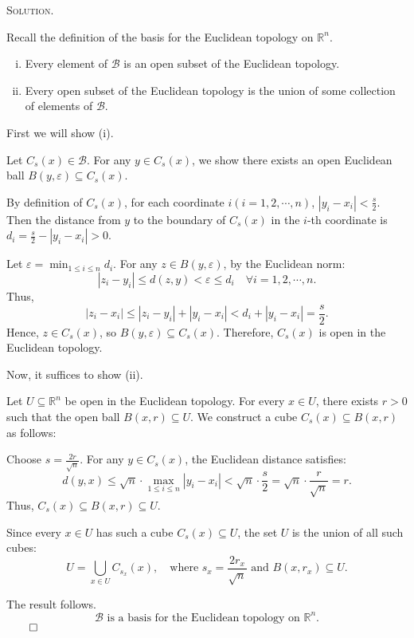 \documentclass[12pt, a4paper, oneside]{ctexart}
\newenvironment{solution}{%
	\par\noindent\textsc{Solution. }\ignorespaces
}{%
	\hfill$\qed$\par
}
\begin{document}
	\begin{solution}

		Recall the definition of the basis for the Euclidean topology on $\mathbb{R}^n$.
		\begin{enumerate}[(i)]
			\item Every element of \(\mathcal{B}\) is an open subset of the Euclidean topology.  
			\item Every open subset of the Euclidean topology is the union of some collection of elements of \(\mathcal{B}\).
		\end{enumerate}
		  
		First we will show (i).
		
		Let \(C_s(x) \in \mathcal{B}\). For any \(y \in C_s(x)\), we show there exists an open Euclidean ball \(B(y, \varepsilon) \subseteq C_s(x)\).  
		
		By definition of \(C_s(x)\), for each coordinate \(i(i=1,2,\cdots,n)\), \(|y_i - x_i| < \frac{s}{2}\).  
		Then the distance from \(y\) to the boundary of \(C_s(x)\) in the \(i\)-th coordinate is \(d_i = \frac{s}{2} - |y_i - x_i| > 0\).  
		
		Let \(\varepsilon = \min_{1 \leq i \leq n} d_i\). For any \(z \in B(y, \varepsilon)\), by the Euclidean norm:  
		  \[
		  |z_i - y_i| \leq d(z,y) < \varepsilon \leq d_i \quad \forall i = 1,2,\cdots,n.
		  \]  
		  Thus,  
		  \[
		  |z_i - x_i| \leq |z_i - y_i| + |y_i - x_i| < d_i + |y_i - x_i| = \frac{s}{2}.
		  \]  
		  Hence, \(z \in C_s(x)\), so \(B(y, \varepsilon) \subseteq C_s(x)\). Therefore, \(C_s(x)\) is open in the Euclidean topology.  
		
		Now, it suffices to show (ii).
		
		Let \(U \subseteq \mathbb{R}^n\) be open in the Euclidean topology. For every \(x \in U\), there exists \(r > 0\) such that the open ball \(B(x, r) \subseteq U\). 
		We construct a cube \(C_{s}(x) \subseteq B(x, r)\) as follows:  
		
		Choose \(s = \frac{2r}{\sqrt{n}}\). For any \(y \in C_{s}(x)\), the Euclidean distance satisfies:  
		  \[
		  d(y,x) \leq \sqrt{n} \cdot \max_{1 \leq i \leq n} |y_i - x_i| < \sqrt{n} \cdot \frac{s}{2} = \sqrt{n} \cdot \frac{r}{\sqrt{n}} = r.
		  \]  
		  Thus, \(C_{s}(x) \subseteq B(x, r) \subseteq U\).  
		
		Since every \(x \in U\) has such a cube \(C_{s}(x) \subseteq U\), the set \(U\) is the union of all such cubes:  
		\[
		U = \bigcup_{x \in U} C_{s_x}(x), \quad \text{where } s_x = \frac{2r_x}{\sqrt{n}} \text{ and } B(x, r_x) \subseteq U.
		\]  
		
		The result follows.
		\[
		\boxed{\mathcal{B} \text{ is a basis for the Euclidean topology on } \mathbb{R}^n.}
		\]  
	\end{solution}
	
\end{document}
